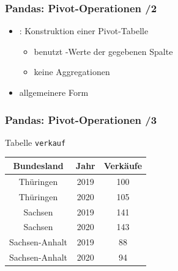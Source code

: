 \begin{frame}[fragile]
  \frametitle{Pandas: Pivot-Operationen /2}

  \begin{itemize}
      \item {}: Konstruktion einer Pivot-Tabelle
      \begin{itemize}
      \item benutzt -Werte der gegebenen Spalte
      \item keine Aggregationen
    \end{itemize}
    \item allgemeinere Form 
    \end{itemize}

\end{frame}

\begin{frame}[fragile]
  \frametitle{Pandas: Pivot-Operationen /3}

  Tabelle \texttt{verkauf}

  \begin{center}
    \begin{tabular}{|c|c|c|}
    \hline
    \rowcolor{Gray} Bundesland & Jahr & Verkäufe \\
    \hline \hline
Thüringen      & 2019 &  100 \\
Thüringen      & 2020 & 105 \\
Sachsen        & 2019 & 141 \\
Sachsen        & 2020 & 143 \\
Sachsen-Anhalt & 2019 &  88 \\
Sachsen-Anhalt & 2020 &  94 \\
\hline
    \end{tabular}
  \end{center}
\end{frame}

